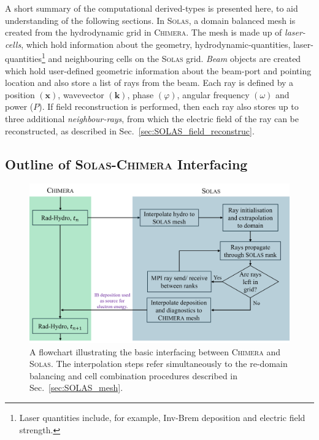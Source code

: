 A short summary of the computational derived-types is presented here, to aid understanding of the following sections.
In \textsc{Solas}, a domain balanced mesh is created from the hydrodynamic grid in \textsc{Chimera}.
The mesh is made up of \textit{laser-cells}, which hold information about the geometry, hydrodynamic-quantities, laser-quantities\footnote{Laser quantities include, for example, \ac{Inv-Brem} deposition and electric field strength.} and neighbouring cells on the \textsc{Solas} grid.
\textit{Beam} objects are created which hold user-defined geometric information about the beam-port and pointing location and also store a list of rays from the beam.
Each ray is defined by a position $(\mathbf{x})$, wavevector $(\mathbf{k})$, phase $(\varphi)$, angular frequency $(\omega)$ and power ($P$).
If field reconstruction is performed, then each ray also stores up to three additional \textit{neighbour-rays}, from which the electric field of the ray can be reconstructed, as described in Sec.~\ref{sec:SOLAS_field_reconstruc}.

\subsection{Outline of \textsc{Solas}-\textsc{Chimera} Interfacing}

\begin{figure}[t!]
    \includegraphics[width=0.9\linewidth]{Numerics/Images/raytrace_flowchart.png}
    \centering
    \caption{A flowchart illustrating the basic interfacing between \textsc{Chimera} and \textsc{Solas}.
    The interpolation steps refer simultaneously to the re-domain balancing and cell combination procedures described in Sec.~\ref{sec:SOLAS_mesh}.}%
    \label{fig:raytrace_flowchart}
\end{figure}

